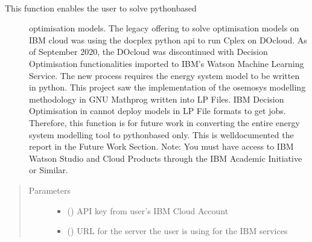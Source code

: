 \documentclass[a4paper,12pt,english]{article}
\begin{document}
\begin{fulllineitems}
\begin{fulllineitems}
\label{\detokenize{GOCPI:GOCPI.Optimisation.Optimisation.run_ibm_wml_do}}~\begin{description}
\item[{This function enables the user to solve python\sphinxhyphen{}based}] \leavevmode
optimisation models. The legacy offering
to solve optimisation models on IBM cloud was using
the docplex python api to run Cplex on DOcloud.
As of September 2020, the DOcloud
was discontinued with Decision Optimisation
functionalities imported to IBM’s Watson Machine
Learning Service. The new process requires the
energy system model to be written in python. This
project saw the implementation of the osemosys
modelling methodology in GNU Mathprog written into
LP Files. IBM Decision Optimisation in cannot deploy
models in LP File formats to get jobs. Therefore,
this function is for future work in converting the
entire energy system modelling tool to python\sphinxhyphen{}based only.
This is well\sphinxhyphen{}documented the report in the Future Work
Section. Note: You must have access to IBM Watson Studio
and Cloud Products through the IBM Academic Initiative or
Similar.

\end{description}
\begin{quote}\begin{description}
\item[{Parameters}] \leavevmode\begin{itemize}
\item {} 
 () \textendash{} API key from user’s IBM Cloud Account

\item {} 
 (\sphinxstyleliteralemphasis{\sphinxupquote{{[}}}\sphinxstyleliteralemphasis{\sphinxupquote{{]}}}) \textendash{} URL for the server the user is using for the IBM services


\end{itemize}
\end{description}
\end{quote}
\end{fulllineitems}
\end{fulllineitems}
\end{document}
